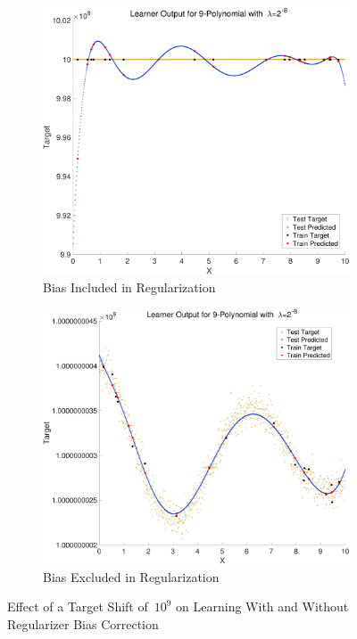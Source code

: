\documentclass{report}
\begin{document}
  \begin{figure}[h]
    \centering
    \begin{subfigure}[h]{0.45\linewidth}
      \includegraphics[width=\linewidth]{shift_without_bias_correction}
      \caption{Bias Included in Regularization}
    \end{subfigure}
    \begin{subfigure}[h]{0.47\linewidth}
      \includegraphics[width=\linewidth]{shift_with_bias_correction}
      \caption{Bias Excluded in Regularization}
    \end{subfigure}
    \caption{Effect of a Target Shift of~$10^{9}$ on Learning With and Without Regularizer Bias Correction}\label{fig:shiftEffectWithWithoutRegularizer}
  \end{figure}
  
\end{document}

